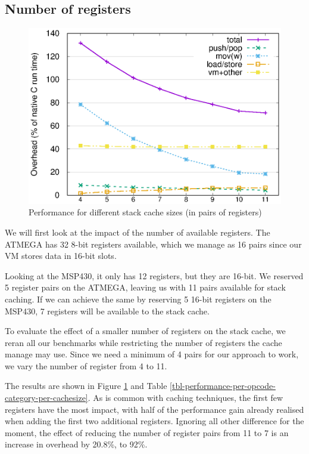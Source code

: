 \subsection{Number of registers}
\begin{figure}
    \centering
    \includegraphics[width=\myfiguresizeperformance]{cachesize-performance-per-opcode-category.eps}
    \caption{Performance for different stack cache sizes (in pairs of registers)}
    \label{fig-performance-per-opcode-category-per-cachesize}
\end{figure}



We will first look at the impact of the number of available registers. The ATMEGA has 32 8-bit registers available, which we manage as 16 pairs since our VM stores data in 16-bit slots.

Looking at the MSP430, it only has 12 registers, but they are 16-bit. We reserved 5 register pairs on the ATMEGA, leaving us with 11 pairs available for stack caching. If we can achieve the same by reserving 5 16-bit registers on the MSP430, 7 registers will be available to the stack cache.

To evaluate the effect of a smaller number of registers on the stack cache, we reran all our benchmarks while restricting the number of registers the cache manage may use. Since we need a minimum of 4 pairs for our approach to work, we vary the number of register from 4 to 11.

The results are shown in Figure \ref{fig-performance-per-opcode-category-per-cachesize} and Table \ref{tbl-performance-per-opcode-category-per-cachesize}. As is common with caching techniques, the first few registers have the most impact, with half of the performance gain already realised when adding the first two additional registers. Ignoring all other difference for the moment, the effect of reducing the number of register pairs from 11 to 7 is an increase in overhead by 20.8\%, to 92\%.

